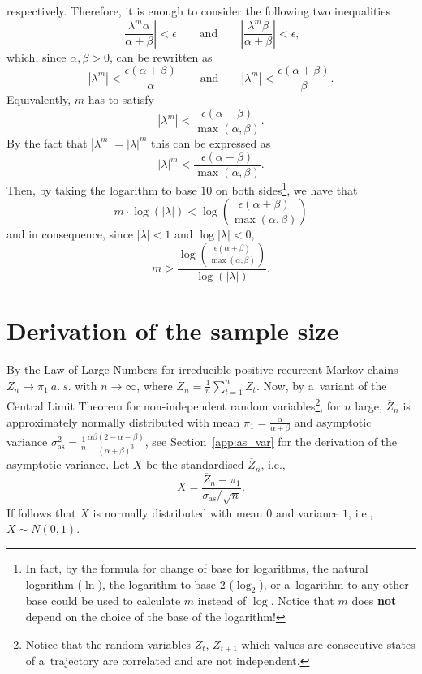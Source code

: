 \documentclass[runningheads,a4paper]{llncs}
\begin{document}
respectively. Therefore, it is enough to consider the following two inequalities
\[
\left|\frac{\lambda^m\alpha}{\alpha+\beta}\right|<\epsilon
\qquad \textrm{and} \qquad
\left|\frac{\lambda^m\beta}{\alpha+\beta}\right|<\epsilon,
\]
which, since $\alpha,\beta > 0$, can be rewritten as
\[
\left|\lambda^m\right|<\frac{\epsilon(\alpha+\beta)}{\alpha}
\qquad \textrm{and} \qquad
\left|\lambda^m\right|<\frac{\epsilon(\alpha+\beta)}{\beta}.
\]
Equivalently, $m$ has to satisfy
\[
\left|\lambda^m\right|<\frac{\epsilon(\alpha+\beta)}{\max(\alpha,\beta)}.
\]
By the fact that $|\lambda^m|=|\lambda|^m$ this can be expressed as
\[
|\lambda|^m<\frac{\epsilon(\alpha+\beta)}{\max(\alpha,\beta)}.
\]
Then, by taking the logarithm to base $10$ on both sides\footnote{In fact, by the formula for
change of base for logarithms, the natural logarithm ($\ln$), the logarithm to base $2$
($\log_2$), or a~logarithm to any other base could be used to calculate $m$ instead of $\log$.
Notice that $m$ does \textbf{not} depend on the choice of the base of the logarithm!}, we have
that
\[
m\cdot\log{(|\lambda|)}<\log{\left(\frac{\epsilon(\alpha+\beta)}{\max(\alpha,\beta)}\right)}
\]
and in consequence, since $|\lambda|<1$ and $\log{|\lambda|} < 0$,
\[
m>\frac{\log{\left(\frac{\epsilon(\alpha+\beta)}{\max(\alpha,\beta)}\right)}}{\log{(|\lambda|)}}.
\]

\section{Derivation of the sample size}
\label{app:n}
By the Law of Large Numbers for irreducible positive recurrent Markov chains
$\overline{Z}_n \to \pi_1\ a.\ s.$ with $n \to \infty$, where $\overline{Z}_n =
\frac{1}{n}\sum_{t=1}^nZ_t$.
Now, by a~variant of the Central Limit Theorem for non-independent random
variables\footnote{Notice that the random variables $Z_t$, $Z_{t+1}$ which values are consecutive
states of a~trajectory are correlated and are not independent.}, for $n$ large, $\overline{Z}_n$
is approximately normally distributed with mean $\pi_1=\frac{\alpha}{\alpha+\beta}$ and asymptotic
variance
$\sigma_{\textrm{as}}^2 = \frac{1}{n}\frac{\alpha\beta(2-\alpha-\beta)}{(\alpha+\beta)^3}$, see
Section~\ref{app:as_var} for the derivation of the asymptotic variance. Let $X$ be the
standardised $\overline{Z}_n$, i.e.,
\[
X=\frac{\overline{Z}_n-\pi_1}{\sigma_{\textrm{as}}/\sqrt{n}}.
\]
If follows that $X$ is normally distributed with mean $0$ and variance $1$, i.e., $X \sim N(0,1)$.
\end{document}
